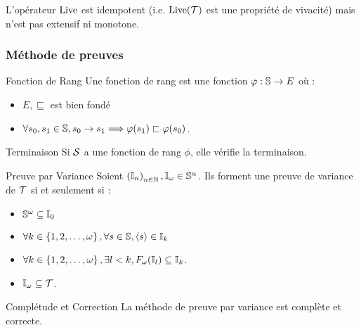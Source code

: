 \documentclass{cours}
\begin{document}
\begin{propositionfr}{}{}
    L'opérateur $\rm Live$ est idempotent (i.e. $\rm Live(\mT)$ est une propriété de vivacité) mais n'est pas extensif ni monotone.
\end{propositionfr}

\subsubsection{Méthode de preuves}
\begin{définition}{Fonction de Rang}{}
    Une fonction de rang est une fonction $\phi : \S\to E$ où : 
    \begin{itemize}
        \item $E, \sqsubseteq$ est bien fondé
        \item $\forall s_{0}, s_{1} \in \S, s_{0} \rightarrow s_{1} \Longrightarrow \phi(s_{1}) \sqsubset \phi(s_{0})$.
    \end{itemize}
\end{définition}

\begin{théorème}{Terminaison}{}
    Si $\mS$ a une fonction de rang $\phi$, elle vérifie la terminaison.
\end{théorème}

\begin{propositionfr}{Preuve par Variance}{}
    Soient $\left(\I_{n}\right)_{n\in \N}, \I_{\omega} \in \S^{\alpha}$. Ils forment une preuve de variance de $\mT$ si et seulement si : 
    \begin{itemize}
        \item $\S^{\omega} \subseteq \I_{0}$
        \item $\forall k \in \left\{1, 2, \ldots, \omega\right\}, \forall s \in \S, \scalar{s} \in \I_{k}$
        \item $\forall k \in \left\{1, 2, \ldots, \omega\right\}, \exists l < k, F_{\omega}(\I_{l}) \subseteq \I_{k}$.
        \item $\I_{\omega} \subseteq \mT$.
    \end{itemize}
\end{propositionfr}
\begin{théorème}{Complétude et Correction}{}
    La méthode de preuve par variance est complète et correcte.
\end{théorème}
\end{document}
